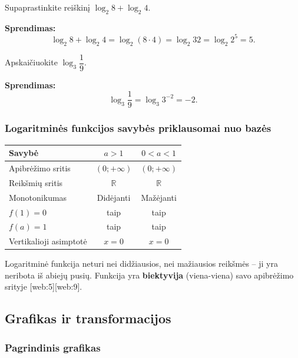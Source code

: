 \begin{example}
Supaprastinkite reiškinį $\log_2 8 + \log_2 4$.

\textbf{Sprendimas:}
\[
  \log_2 8 + \log_2 4 = \log_2(8 \cdot 4) = \log_2 32 = \log_2 2^5 = 5.
\]
\end{example}

\begin{example}
Apskaičiuokite $\log_3 \dfrac{1}{9}$.

\textbf{Sprendimas:}
\[
  \log_3 \frac{1}{9} = \log_3 3^{-2} = -2.
\]
\end{example}

\subsubsection*{Logaritminės funkcijos savybės priklausomai nuo bazės}

\begin{center}
\begin{tabular}{|l|c|c|}
\hline
\textbf{Savybė} & $a > 1$ & $0 < a < 1$ \\
\hline
Apibrėžimo sritis & $(0;+\infty)$ & $(0;+\infty)$ \\
Reikšmių sritis & $\mathbb{R}$ & $\mathbb{R}$ \\
Monotonikumas & Didėjanti & Mažėjanti \\
$f(1) = 0$ & taip & taip \\
$f(a) = 1$ & taip & taip \\
Vertikalioji asimptotė & $x = 0$ & $x = 0$ \\
\hline
\end{tabular}
\end{center}

\begin{remark}
Logaritminė funkcija neturi nei didžiausios, nei mažiausios reikšmės – ji yra neribota iš abiejų pusių. Funkcija yra \textbf{biektyvija} (viena-viena) savo apibrėžimo srityje [web:5][web:9].
\end{remark}

\subsection{Grafikas ir transformacijos}

\subsubsection*{Pagrindinis grafikas}

